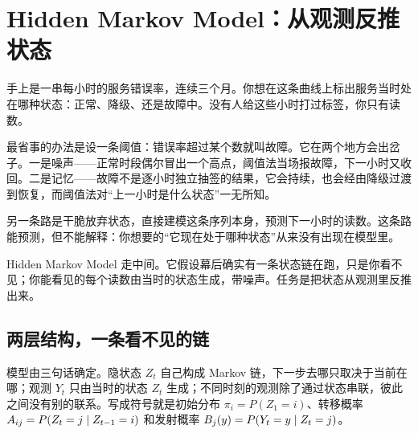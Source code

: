 \section{Hidden Markov Model：从观测反推状态}
\label{sec:06-Random-Processes/04-Applications/04}

手上是一串每小时的服务错误率，连续三个月。你想在这条曲线上标出服务当时处在哪种状态：正常、降级、还是故障中。没有人给这些小时打过标签，你只有读数。

最省事的办法是设一条阈值：错误率超过某个数就叫故障。它在两个地方会出岔子。一是噪声——正常时段偶尔冒出一个高点，阈值法当场报故障，下一小时又收回。二是记忆——故障不是逐小时独立抽签的结果，它会持续，也会经由降级过渡到恢复，而阈值法对``上一小时是什么状态''一无所知。

另一条路是干脆放弃状态，直接建模这条序列本身，预测下一小时的读数。这条路能预测，但不能解释：你想要的``它现在处于哪种状态''从来没有出现在模型里。

Hidden Markov Model 走中间。它假设幕后确实有一条状态链在跑，只是你看不见；你能看见的每个读数由当时的状态生成，带噪声。任务是把状态从观测里反推出来。

\subsection{两层结构，一条看不见的链}

模型由三句话确定。隐状态 \(Z_t\) 自己构成 Markov 链，下一步去哪只取决于当前在哪；观测 \(Y_t\) 只由当时的状态 \(Z_t\) 生成；不同时刻的观测除了通过状态串联，彼此之间没有别的联系。写成符号就是初始分布 \(\pi_i=P(Z_1=i)\)、转移概率 \(A_{ij}=P(Z_t=j\mid Z_{t-1}=i)\) 和发射概率 \(B_j(y)=P(Y_t=y\mid Z_t=j)\)。

